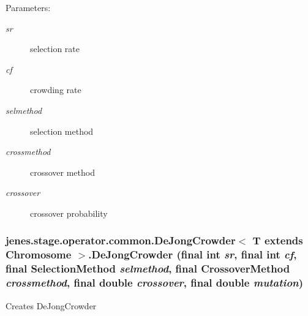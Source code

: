 \begin{Desc}
\item[Parameters:]
\begin{description}
\item[{\em sr}]selection rate \item[{\em cf}]crowding rate \item[{\em selmethod}]selection method \item[{\em crossmethod}]crossover method \item[{\em crossover}]crossover probability \end{description}
\end{Desc}
\hypertarget{classjenes_1_1stage_1_1operator_1_1common_1_1_de_jong_crowder_3_01_t_01extends_01_chromosome_01_4_31f097247f16221e2074ddc05d198349}{
\subsubsection[DeJongCrowder]{\setlength{\rightskip}{0pt plus 5cm}jenes.stage.operator.common.DeJongCrowder$<$ T extends Chromosome $>$.DeJongCrowder (final int {\em sr}, \/  final int {\em cf}, \/  final {\bf SelectionMethod} {\em selmethod}, \/  final {\bf CrossoverMethod} {\em crossmethod}, \/  final double {\em crossover}, \/  final double {\em mutation})}}
\label{classjenes_1_1stage_1_1operator_1_1common_1_1_de_jong_crowder_3_01_t_01extends_01_chromosome_01_4_31f097247f16221e2074ddc05d198349}


Creates DeJongCrowder

